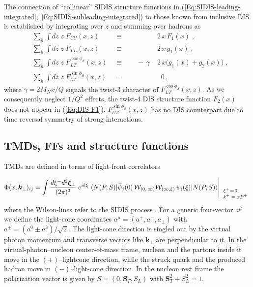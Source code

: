 \documentclass[a4paper,11pt]{article}
\newcommand{\blue}[1]{{\color{blue} #1}}
\newcommand{\be}{\begin{equation}}
\newcommand{\ee}{\end{equation}}
\newcommand{\la}{\langle}
\newcommand{\ra}{\rangle}
\newcommand{\with}[3]{{\Biggl|{\renewcommand*{\arraystretch}{0.8}
	\begin{array}{l} 
	\phantom{X}\\
	\mbox{\scriptsize ${#1}$}\\
	\mbox{\scriptsize ${#2}$}\\
	\mbox{\scriptsize #3}\end{array}}}}
\newcommand{\ps}[1]{\blue{ #1}}
\def\bfkperp{{\bm k}_\perp}
\begin{document}
The connection of ``collinear'' SIDIS structure functions
in (\ref{Eq:SIDIS-leading-integrated},~\ref{Eq:SIDIS-subleading-integrated})
to those known from inclusive DIS is established by integrating over $z$
and summing over hadrons as 
\begin{subequations}\begin{alignat}{4}
	&\sum\limits_h\int d z\;z\;F_{UU}(x,z) 
	&\equiv	&&	& 2\,x\,F_1(x) \;, 
	\label{Eq:DIS-F1}\\ %
	&\sum\limits_h\int d z\;z\;F_{LL}(x,z) 
	&\equiv && 	& 2\,x\,g_1(x) \;, 
	\label{Eq:DIS-g1}\\ %
	&\sum\limits_h\int d z\;z\;F_{LT}^{\cos\phi_S}(x,z) \;\;
	&\equiv && \;\; -\,\gamma\; & 2\,x\biggl(g_1(x)+g_2(x)\biggr) \;, 
	\label{Eq:DIS-gT}\\ %
	&\sum\limits_h\int d z\;z\;F_{UT}^{\sin\phi_S}(x,z) 
	&=      && 	    & \;\; 0 \, ,
	\label{Eq:DIS-zero}
\end{alignat}\end{subequations}
where $\gamma=2M_Nx/Q$ signals the twist-3 character of $F_{LT}^{\cos\phi_S}(x,z)$.
\ps{As we consequently neglect $1/Q^2$ effects, the twist-4 DIS structure 
function $F_2(x)$ does not appear in (\ref{Eq:DIS-F1}).}
$F_{UT}^{\sin\phi_S}(x,z)$ has no DIS 
counterpart due to time reversal symmetry of strong interactions. 

\subsection{TMDs, FFs and structure functions}
\label{Sec-2.2:def-TMD-FF}

TMDs are defined in terms of light-front correlators
\be\label{Eq:correlator}
    	\Phi(x,\bfkperp)_{ij} = \int\frac{ d \xi^- d^2{\bm \xi}_\perp}{(2\pi)^3}
	\;e^{ik\xi}\;\la N(P,S)|\bar\psi_j(0)\,{\cal W}_{(0,\,\infty)}
	{\cal W}_{(\infty,\xi)}\,\psi_i(\xi)|N(P,S)\ra
    	\with{ }{\xi^+\!=\!0}{$k^+ = xP^+$}
	\ee
where the %
Wilson-lines refer to the SIDIS process 
\cite{Collins:2002kn}. For a generic four-vector $a^\mu$ we define
the light-cone coordinates $a^\mu=(a^+,a^-,a_\perp)$ with 
$a^\pm=(a^0\pm a^3)/\sqrt{2}$. 
The light-cone direction is singled out by the virtual photon momentum 
and transverse vectors like $\bfkperp$ are perpendicular to it. In the
virtual-photon--nucleon center-of-mass frame, nucleon and the partons 
inside it move in the $(+)$--lightcone direction, while the struck 
quark and the produced hadron move in $(-)$--light-cone direction.
In the nucleon rest frame the polarization vector is given by 
$S=(0,{\bm S}_T,S_L)$ with ${\bm S}_T^2+S_L^2=1$.
\end{document}
